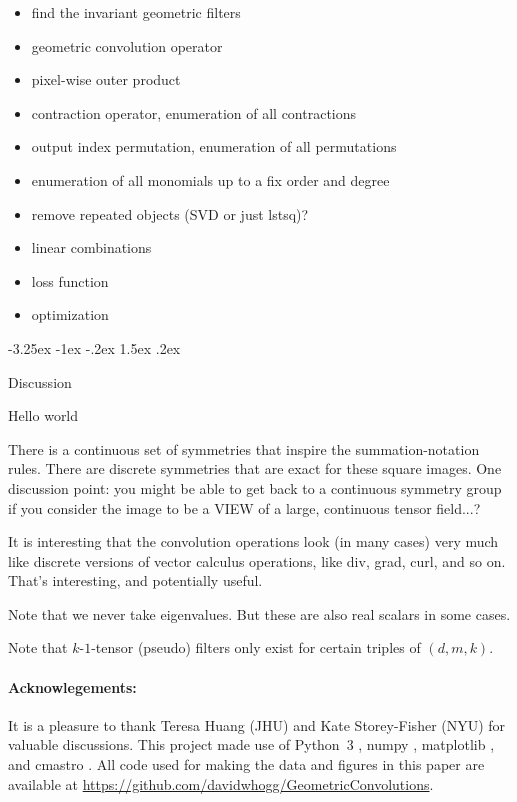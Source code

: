 \documentclass{article}
\makeatletter
\theoremstyle{plain}
\renewcommand\section{\@startsection {section}{1}{\z@}%
  {-3.25ex \@plus -1ex \@minus -.2ex}%
  {1.5ex \@plus .2ex}%
  {\raggedright\normalfont\large\bfseries}}%
\makeatother
\begin{document}
\begin{itemize}
    \item find the invariant geometric filters
    \item geometric convolution operator
    \item pixel-wise outer product
    \item contraction operator, enumeration of all contractions
    \item output index permutation, enumeration of all permutations
    \item enumeration of all monomials up to a fix order and degree 
    \item remove repeated objects (SVD or just lstsq)?
    \item linear combinations 
    \item loss function
    \item optimization
\end{itemize}


\section{Discussion}\label{sec:discussion}

Hello world

There is a continuous set of symmetries that inspire the summation-notation rules. There are discrete symmetries that are exact for these square images. 
One discussion point: you might be able to get back to a continuous symmetry group if you consider the image to be a VIEW of a large, continuous tensor field...?

It is interesting that the convolution operations look (in many cases) very much like discrete versions of vector calculus operations, like div, grad, curl, and so on. That's interesting, and potentially useful.

Note that we never take eigenvalues. But these are also real scalars in some cases.

Note that $k$-$1$-tensor (pseudo) filters only exist for certain triples of $(d, m, k)$.

\paragraph{Acknowlegements:}
It is a pleasure to thank Teresa Huang (JHU) and Kate Storey-Fisher (NYU) for valuable discussions.
This project made use of Python~3 \cite{python3}, numpy \cite{numpy}, matplotlib \cite{matplotlib}, and cmastro \cite{cmastro}.
All code used for making the data and figures in this paper are available at \url{https://github.com/davidwhogg/GeometricConvolutions}.


\raggedright

\end{document}

